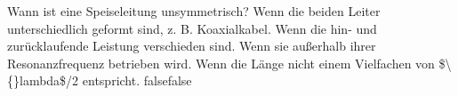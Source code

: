     {Wann ist eine Speiseleitung unsymmetrisch?}
    {Wenn die beiden Leiter unterschiedlich geformt sind, z. B. Koaxialkabel.}
    {Wenn die hin- und zurücklaufende Leistung verschieden sind.}
    {Wenn sie außerhalb ihrer Resonanzfrequenz betrieben wird.}
    {Wenn die Länge nicht einem Vielfachen von \$\textbackslash\{\}lambda\$/2 entspricht.}
    {false}{false}